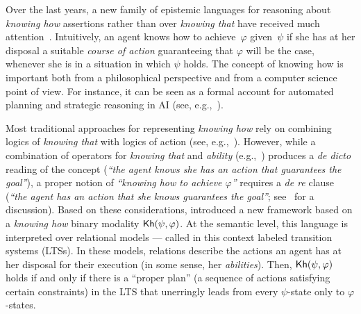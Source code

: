 Over the last years, a new family of epistemic languages for reasoning about \emph{knowing how} assertions rather than over \emph{knowing that} have received much attention~\cite{Pavese22}. Intuitively, an agent knows how to achieve~$\varphi$ given~$\psi$ if she has at her disposal a suitable \emph{course of action} guaranteeing that $\varphi$ will be the case, whenever she is in a situation in which $\psi$ holds. The concept of knowing how is important both from a philosophical perspective and from a computer science point of view. For instance, it can be seen as a formal account for automated planning and strategic reasoning in AI (see, e.g.,~\cite{KandA15}).

Most traditional approaches for representing \emph{knowing how} rely on combining logics of \emph{knowing that} with logics of action (see,
e.g.,~\cite{Mccarthy69,Les00,HerzigT06}). However,
while a combination of operators for \emph{knowing that} and \emph{ability} (e.g.,~\cite{wiebeetal:2003}) produces a \emph{de dicto} reading of the concept (\emph{``the agent knows she has an action that guarantees the goal''}), a proper notion of \emph{``knowing how to achieve $\varphi$''} requires a \emph{de re} clause (\emph{``the agent has an action that she knows guarantees the goal''}; see~\cite{JamrogaA07,Herzig15} for a discussion).
Based on these considerations, \cite{Wang15lori,Wang2016} introduced
a new framework based on a \emph{knowing how} binary modality
${\sf Kh}(\psi,\varphi)$. At the semantic level, this language is interpreted over relational models --- called in this context labeled transition systems (LTSs).
In these models, relations describe the actions an
agent has at her disposal for their execution (in some sense, her \emph{abilities}).
Then,
${\sf Kh}(\psi,\varphi)$ holds if and only if there is a ``proper plan'' (a sequence of
actions satisfying certain constraints) in the LTS that
unerringly leads from every $\psi$-state only to $\varphi$-states.


